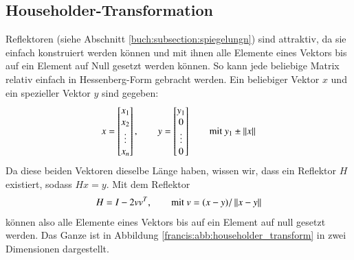 \subsection{Householder-Transformation\label{francis:section:grundlagen:householder}}
%
Reflektoren (siehe Abschnitt \ref{buch:subsection:spiegelungn}) sind attraktiv, da sie einfach konstruiert werden können und mit ihnen alle Elemente eines Vektors bis auf ein Element auf Null gesetzt werden können.
So kann jede beliebige Matrix relativ einfach in Hessenberg-Form gebracht werden.
Ein beliebiger Vektor $x$ und ein spezieller Vektor $y$ sind gegeben:
\begin{equation}
	x=
	\begin{bmatrix}
	x_{1}\\
	x_{2}\\
	\vdots\\
	x_{n}\\
	\end{bmatrix}
	,\qquad y=
	\begin{bmatrix}
	y_{1}\\
	0\\
	\vdots\\
	0\\
	\end{bmatrix}\qquad \text{mit } y_{1}\pm \left\lVert x\right\rVert	
\end{equation}
Da diese beiden Vektoren dieselbe Länge haben, wissen wir, dass ein Reflektor $H$ existiert, sodass $Hx=y$.
Mit dem Reflektor
\begin{equation}
	H=I-2vv^{T}, \qquad \text{mit } v=(x-y)/\left\lVert x-y\right\rVert
\end{equation}
können also alle Elemente eines Vektors bis auf ein Element auf null gesetzt werden.
Das Ganze ist in Abbildung \ref{francis:abb:householder_transform} in zwei Dimensionen dargestellt.
